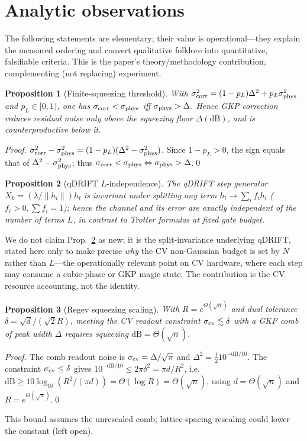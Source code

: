 \documentclass[aps,prxquantum,reprint,superscriptaddress,nofootinbib]{revtex4-2}
\newtheorem{proposition}{Proposition}
\begin{document}
\section{Analytic observations}
The following statements are elementary; their value is operational---they
explain the measured ordering and convert qualitative folklore into
quantitative, falsifiable criteria. This is the paper's theory/methodology
contribution, complementing (not replacing) experiment.
\begin{proposition}[Finite-squeezing threshold]\label{prop:floor}
With $\sigma_{\rm corr}^2=(1-p_L)\Delta^2+p_L\sigma_{\rm phys}^2$ and
$p_L\in[0,1)$, one has $\sigma_{\rm corr}<\sigma_{\rm phys}$ iff
$\sigma_{\rm phys}>\Delta$. Hence GKP correction reduces residual noise only
above the squeezing floor $\Delta(\mathrm{dB})$, and is counterproductive
below it.
\end{proposition}
\begin{proof}
$\sigma_{\rm corr}^2-\sigma_{\rm phys}^2=(1-p_L)(\Delta^2-\sigma_{\rm phys}^2)$.
Since $1-p_L>0$, the sign equals that of $\Delta^2-\sigma_{\rm phys}^2$;
thus $\sigma_{\rm corr}<\sigma_{\rm phys}\Leftrightarrow\sigma_{\rm phys}
>\Delta$.\qed
\end{proof}
\begin{proposition}[qDRIFT $L$-independence]\label{prop:qdrift}
The qDRIFT step generator $X_k=(\lambda/\lVert h_l\rVert)h_l$ is invariant
under splitting any term $h_l\to\sum_i f_i h_l$ ($f_i>0,\sum f_i=1$); hence the
channel and its error are exactly independent of the number of terms $L$, in
contrast to Trotter formulas at fixed gate budget.
\end{proposition}
We do not claim Prop.~\ref{prop:qdrift} as new; it is the split-invariance
underlying qDRIFT, stated here only to make precise \emph{why} the CV
non-Gaussian budget is set by $N$ rather than $L$---the operationally relevant
point on CV hardware, where each step may consume a cubic-phase or GKP magic
state. The contribution is the CV resource accounting, not the identity.
\begin{proposition}[Regev squeezing scaling]\label{prop:regev}
With $R=e^{\Theta(\sqrt{n})}$ and dual tolerance $\delta=\sqrt{d}/(\sqrt2 R)$,
meeting the CV readout constraint $\sigma_{\rm cv}\lesssim\delta$ with a GKP
comb of peak width $\Delta$ requires squeezing $\mathrm{dB}=\Theta(\sqrt{n})$.
\end{proposition}
\begin{proof}
The comb readout noise is $\sigma_{\rm cv}=\Delta/\sqrt\pi$ and
$\Delta^2=\tfrac12 10^{-\mathrm{dB}/10}$. The constraint
$\sigma_{\rm cv}\le\delta$ gives
$10^{-\mathrm{dB}/10}\le 2\pi\delta^2=\pi d/R^2$, i.e.
$\mathrm{dB}\ge 10\log_{10}(R^2/(\pi d))=\Theta(\log R)=\Theta(\sqrt n)$,
using $d=\Theta(\sqrt n)$ and $R=e^{\Theta(\sqrt n)}$.\qed
\end{proof}
This bound assumes the unrescaled comb; lattice-spacing rescaling could lower
the constant (left open).
\end{document}
